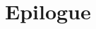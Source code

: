 \chapter{Epilogue}

\backmatter




\clearpage

\clearpage

\twocolumn[
]
{\small\printindex}

\vfil


